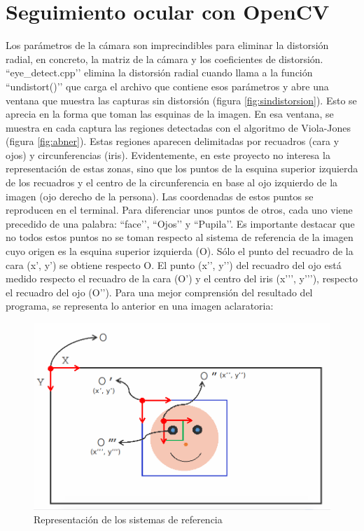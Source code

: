 \section{Seguimiento ocular con OpenCV} \label{s4_3}


Los parámetros de la cámara son imprecindibles para eliminar la distorsión radial, en concreto, la matriz de la cámara y los coeficientes de distorsión. ``eye\_detect.cpp’’ elimina la distorsión radial cuando llama a la función ``undistort()’’ que carga el archivo que contiene esos parámetros y abre una ventana que muestra las capturas sin distorsión (figura \ref{fig:sindistorsion}). Esto se aprecia en la forma que toman las esquinas de la imagen. En esa ventana, se muestra en cada captura las regiones detectadas con el algoritmo de Viola-Jones (figura \ref{fig:abner}). Estas regiones aparecen delimitadas por recuadros (cara y ojos) y circunferencias (iris). Evidentemente, en este proyecto no interesa la representación de estas zonas, sino que los puntos de la esquina superior izquierda de los recuadros y el centro de la circunferencia en base al ojo izquierdo de la imagen (ojo derecho de la persona). Las coordenadas de estos puntos se reproducen en el terminal. Para diferenciar unos puntos de otros, cada uno viene precedido de una palabra: ``face’’, ``Ojos’’ y ``Pupila’’. Es importante destacar que no todos estos puntos no se toman respecto al sistema de referencia de la imagen cuyo origen es la esquina superior izquierda (O). Sólo el punto del recuadro de la cara (x’, y’) se obtiene respecto O. El punto (x’’, y’’) del recuadro del ojo está medido respecto el recuadro de la cara (O’) y el centro del iris (x’’’, y’’’), respecto el recuadro del ojo (O’’). Para una mejor comprensión del resultado del programa, se representa lo anterior en una imagen aclaratoria:

    \begin{figure}
    \centering
    \includegraphics[scale = 0.5]{capitulo_04/figuras_dir/cara.jpg}
    \caption{Representación de los sistemas de referencia}
    \end{figure}





